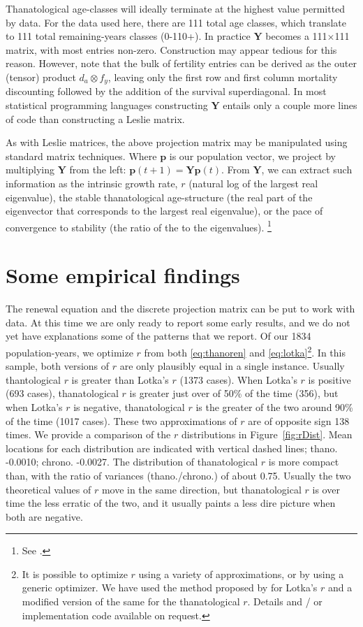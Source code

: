 \documentclass{article}
\begin{document}
Thanatological age-classes will ideally terminate at the highest value permitted
by data. For the data used here, there are 111 total age classes, which
translate to 111 total remaining-years classes (0-110+). In practice $\textbf{Y}$ becomes
a 111$\times$111 matrix, with most entries non-zero. Construction may appear
tedious for this reason. However, note that the bulk of fertility entries can
be derived as the outer (tensor) product $d_a \otimes f_y$, leaving only the 
first row and first column mortality discounting followed by the addition of the
survival superdiagonal. In most statistical programming languages constructing $\textbf{Y}$ entails only
a couple more lines of code than constructing a Leslie matrix.

As with Leslie matrices, the above projection matrix may be manipulated using
standard matrix techniques. Where $\textbf{p}$ is our population vector, we
project by multiplying $\textbf{Y}$ from the left: $\textbf{p}(t + 1) =
\textbf{Y}\textbf{p}(t)$. From $\textbf{Y}$, we can extract such information as 
the intrinsic growth rate, $r$ (natural log of the largest
real eigenvalue), the stable thanatological age-structure (the real part of the
eigenvector that corresponds to the largest real eigenvalue), or the pace of
convergence to stability (the ratio of the  to the  eigenvalues).
\footnote{See \citet[p.86-87]{caswell2001matrix}.}

\section*{Some empirical findings}
The renewal equation and the discrete projection matrix can be put
to work with data. At this time we are only ready to report some early
results, and we do not yet have explanations some of the patterns that we
report. Of our 1834 population-years, we optimize $r$ from both
\eqref{eq:thanoren} and \eqref{eq:lotka}\footnote{It is possible to optimize $r$ using a variety of approximations, or by using a generic optimizer. We have used the method proposed by \citet{coale1957new} for Lotka's $r$ and a modified version of the same for
the thanatological $r$. Details and / or implementation code available on
request.}. In this sample, both versions of $r$ are only plausibly equal in a
single instance. Usually thantological $r$ is greater than Lotka's $r$ (1373
cases). When Lotka's $r$ is positive (693 cases), thanatological $r$ is greater
just over of 50\% of the time (356), but when Lotka's $r$ is negative,
thanatological $r$ is the greater of the two around 90\% of the time (1017
cases). These two approximations of $r$ are of opposite sign 138 times. We
provide a comparison of the $r$ distributions in Figure~\ref{fig:rDist}. Mean
locations for each distribution are indicated with vertical dashed lines; thano.
-0.0010; chrono. -0.0027. The distribution of thanatological $r$ is more compact
than, with the ratio of variances (thano./chrono.) of about 0.75. Usually the
two theoretical values of $r$ move in the same direction, but thanatological $r$
is over time the less erratic of the two, and it usually paints a less dire picture when both are negative.
\end{document}
